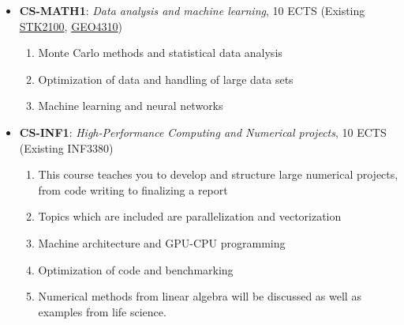 \documentclass[%
oneside,                 %
final,                   %
10pt]{article}
\begin{document}
\begin{itemize}
\item \textbf{CS-MATH1}: \emph{Data analysis and machine learning}, 10 ECTS (Existing \href{{http://www.uio.no/studier/emner/matnat/math/STK2100/}}{STK2100}, \href{{http://www.uio.no/studier/emner/matnat/geofag/GEO4310/}}{GEO4310})
\begin{enumerate}

 \item Monte Carlo methods and statistical data analysis

 \item Optimization of data and handling of large data sets

 \item Machine learning and neural networks

\end{enumerate}

\noindent
\item \textbf{CS-INF1}: \emph{High-Performance Computing and Numerical projects}, 10 ECTS (Existing INF3380)
\begin{enumerate}

 \item This course teaches you to develop and structure large numerical projects, from code writing to  finalizing a report

 \item Topics which are included are parallelization and vectorization

 \item Machine architecture and GPU-CPU programming

 \item Optimization of code and benchmarking

 \item Numerical methods from linear algebra will be discussed as well as examples from life science.
\end{enumerate}

\noindent
\end{itemize}

\noindent



\end{document}
